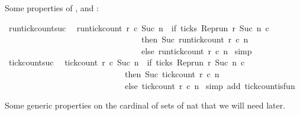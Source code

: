 \begin{isabellebody}
%
\begin{isamarkuptext}%
Some properties of ,  
  and :%
\end{isamarkuptext}\isamarkuptrue%
\isamarkupfalse%
\ run{\isacharunderscore}tick{\isacharunderscore}count{\isacharunderscore}suc{\isacharcolon}\isanewline
\ \ {\isacartoucheopen}run{\isacharunderscore}tick{\isacharunderscore}count\ r\ c\ {\isacharparenleft}Suc\ n{\isacharparenright}\ {\isacharequal}\ {\isacharparenleft}if\ ticks\ {\isacharparenleft}{\isacharparenleft}Rep{\isacharunderscore}run\ r{\isacharparenright}\ {\isacharparenleft}Suc\ n{\isacharparenright}\ c{\isacharparenright}\isanewline
\ \ \ \ \ \ \ \ \ \ \ \ \ \ \ \ \ \ \ \ \ \ \ \ \ \ \ \ \ \ \ \ \ then\ Suc\ {\isacharparenleft}run{\isacharunderscore}tick{\isacharunderscore}count\ r\ c\ n{\isacharparenright}\isanewline
\ \ \ \ \ \ \ \ \ \ \ \ \ \ \ \ \ \ \ \ \ \ \ \ \ \ \ \ \ \ \ \ \ else\ run{\isacharunderscore}tick{\isacharunderscore}count\ r\ c\ n{\isacharparenright}{\isacartoucheclose}\isanewline
%
\isadelimproof
%
\endisadelimproof
%
\isatagproof
{}\isamarkupfalse%
\ simp%
\endisatagproof
{\isafoldproof}%
%
\isadelimproof
\isanewline
%
\endisadelimproof
\isanewline
{}\isamarkupfalse%
\ tick{\isacharunderscore}count{\isacharunderscore}suc{\isacharcolon}\isanewline
\ \ {\isacartoucheopen}tick{\isacharunderscore}count\ r\ c\ {\isacharparenleft}Suc\ n{\isacharparenright}\ {\isacharequal}\ {\isacharparenleft}if\ ticks\ {\isacharparenleft}{\isacharparenleft}Rep{\isacharunderscore}run\ r{\isacharparenright}\ {\isacharparenleft}Suc\ n{\isacharparenright}\ c{\isacharparenright}\isanewline
\ \ \ \ \ \ \ \ \ \ \ \ \ \ \ \ \ \ \ \ \ \ \ \ \ \ \ \ \ then\ Suc\ {\isacharparenleft}tick{\isacharunderscore}count\ r\ c\ n{\isacharparenright}\isanewline
\ \ \ \ \ \ \ \ \ \ \ \ \ \ \ \ \ \ \ \ \ \ \ \ \ \ \ \ \ else\ tick{\isacharunderscore}count\ r\ c\ n{\isacharparenright}{\isacartoucheclose}\isanewline
%
\isadelimproof
%
\endisadelimproof
%
\isatagproof
{}\isamarkupfalse%
\ {\isacharparenleft}simp\ add{\isacharcolon}\ tick{\isacharunderscore}count{\isacharunderscore}is{\isacharunderscore}fun{\isacharparenright}%
\endisatagproof
{\isafoldproof}%
%
\isadelimproof
%
\endisadelimproof
%
\begin{isamarkuptext}%
Some generic properties on the cardinal of sets of nat that we will need later.%
\end{isamarkuptext}\isamarkuptrue%
\isamarkupfalse%

\end{isabellebody}
